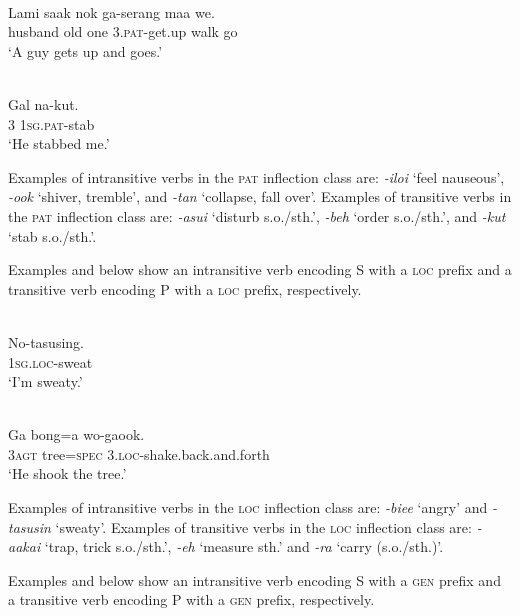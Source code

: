 \ea%
\label{bkm:Ref324337569}
 \\ 
\gll    Lami  saak  nok  ga-serang  maa  we.\\  
    husband  old  one  3.\textsc{pat}{}-get.up  walk  go  \\
\glt  `A guy gets up and goes.'
\z


\ea%
\label{bkm:Ref324338165}
 \\ 
\gll   Gal  na-kut.     \\  
   3  1\textsc{sg.pat}-stab     \\
\glt `He stabbed me.'
\z

Examples of intransitive verbs in the \textsc{pat} inflection class are: \textit{-iloi} `feel nauseous', \textit{-ook} `shiver, tremble', and \textit{-tan} `collapse, fall over'. Examples of transitive verbs in the \textsc{pat} inflection class are: \textit{-asui} `disturb s.o./sth.', \textit{-beh} `order s.o./sth.', and \textit{-kut} `stab s.o./sth.'.

Examples  and  below show an intransitive verb encoding S with a \textsc{loc} prefix and a transitive verb encoding P with a \textsc{loc} prefix, respectively.


\ea%
\label{bkm:Ref324338359}
 \\ 
\gll    No-tasusing.   \\  
    \textsc{1sg.loc}{}-sweat   \\
\glt  `I'm sweaty.'
\z


\ea 
\label{ex:10:1238}
 \\ 
 \gll    Ga  bong=a  wo-gaook.  \\
 \textsc{3agt} tree=\textsc{spec} 3.\textsc{loc}{}-shake.back.and.forth     \\
 \glt  `He shook the tree.'
\z



Examples of intransitive verbs in the \textsc{loc} inflection class are: \textit{-biee} `angry' and \textit{-tasusin} `sweaty'. Examples of transitive verbs in the \textsc{loc} inflection class are: \textit{-aakai} `trap, trick s.o./sth.', \textit{-eh} `measure sth.' and \textit{-ra} `carry (s.o./sth.)'.

Examples  and  below show an intransitive verb encoding S with a \textsc{gen} prefix and a transitive verb encoding P with a \textsc{gen} prefix, respectively.



